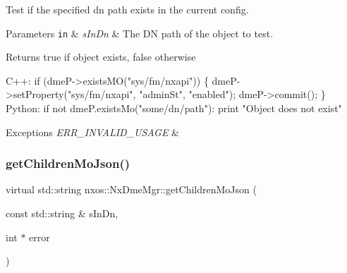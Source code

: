 Test if the specified dn path exists in the current config. 
\begin{DoxyParams}[1]{Parameters}
\mbox{\tt in}  & {\em s\+In\+Dn} & The DN path of the object to test. \\
\hline
\end{DoxyParams}
\begin{DoxyReturn}{Returns}
true if object exists, false otherwise 
\begin{DoxyCode}
C++:
  \textcolor{keywordflow}{if} (dmeP->existsMO(\textcolor{stringliteral}{"sys/fm/nxapi"})) \{
      dmeP->setProperty(\textcolor{stringliteral}{"sys/fm/nxapi"}, \textcolor{stringliteral}{"adminSt"}, \textcolor{stringliteral}{"enabled"});
      dmeP->commit();
  \}
Python:
  \textcolor{keywordflow}{if} not dmeP.existsMo(\textcolor{stringliteral}{"some/dn/path"}):
      print \textcolor{stringliteral}{"Object does not exist"}
\end{DoxyCode}

\end{DoxyReturn}

\begin{DoxyExceptions}{Exceptions}
{\em E\+R\+R\+\_\+\+I\+N\+V\+A\+L\+I\+D\+\_\+\+U\+S\+A\+GE} & \\
\hline
\end{DoxyExceptions}
\mbox{\label{classnxos_1_1_nx_dme_mgr_a950c598125c2cc0d739c4a882a65f447}} 
\subsubsection{\texorpdfstring{get\+Children\+Mo\+Json()}{getChildrenMoJson()}}
{\footnotesize\ttfamily virtual std\+::string nxos\+::\+Nx\+Dme\+Mgr\+::get\+Children\+Mo\+Json (\begin{DoxyParamCaption}\item[{const std\+::string \&}]{s\+In\+Dn,  }\item[{int $\ast$}]{error }\end{DoxyParamCaption})\hspace{0.3cm}{\ttfamily [pure virtual]}}

